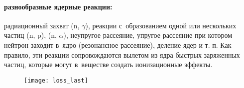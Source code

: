 \paragraph{разнообразные ядерные реакции:} радиационный захват
(n, $\gamma$), реакции с~образованием одной или нескольких частиц (n, p),
(n, $\alpha$), неупругое рассеяние, упругое рассеяние при котором нейтрон
заходит в~ядро (резонансное рассеяние), деление ядер и т. п. Как правило,
эти реакции сопровождаются вылетом из ядра быстрых заряженных частиц,
которые могут в~веществе создать ионизационные эффекты.
\vspace{5.0cm}
\begin{figure}[h]\center
  \hspace*{-0.5cm}
  \texttt{[image: loss\_last]}
\end{figure}




